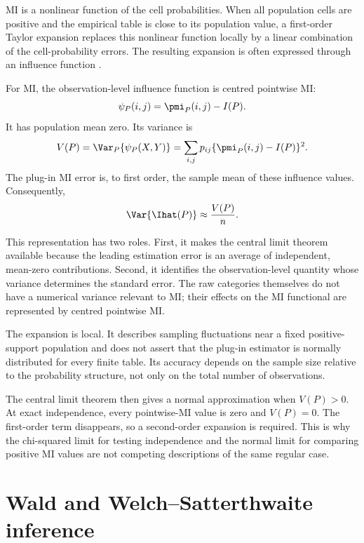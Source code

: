MI is a nonlinear function of the cell probabilities. When all population
cells are positive and the empirical table is close to its population value,
a first-order Taylor expansion replaces this nonlinear function locally by a
linear combination of the cell-probability errors. The resulting expansion is
often expressed through an influence function \citep{kandasamy2015}.

For MI, the observation-level influence function is centred pointwise MI:
\begin{equation}
  \psi_P(i,j)=\pmi_P(i,j)-I(P).
  \label{eq:mi-if-background}
\end{equation}
It has population mean zero. Its variance is
\begin{equation}
  V(P)
  =\Var_P\{\psi_P(X,Y)\}
  =\sum_{i,j}p_{ij}\{\pmi_P(i,j)-I(P)\}^2.
  \label{eq:mi-variance-background}
\end{equation}
The plug-in MI error is, to first order, the sample mean of these influence
values. Consequently,
\begin{equation}
  \Var\{\Ihat(P)\}\approx\frac{V(P)}{n}.
  \label{eq:first-order-mi-var-background}
\end{equation}

This representation has two roles. First, it makes the central limit theorem
available because the leading estimation error is an average of independent,
mean-zero contributions. Second, it identifies the observation-level
quantity whose variance determines the standard error. The raw categories
themselves do not have a numerical variance relevant to MI; their effects on
the MI functional are represented by centred pointwise MI.

The expansion is local. It describes sampling fluctuations near a fixed
positive-support population and does not assert that the plug-in estimator is
normally distributed for every finite table. Its accuracy depends on the
sample size relative to the probability structure, not only on the total
number of observations.

The central limit theorem then gives a normal approximation when
\(V(P)>0\). At exact independence, every pointwise-MI value is zero and
\(V(P)=0\). The first-order term disappears, so a second-order expansion is
required. This is why the chi-squared limit for testing independence and the
normal limit for comparing positive MI values are not competing descriptions
of the same regular case.

\section{Wald and Welch--Satterthwaite inference}

